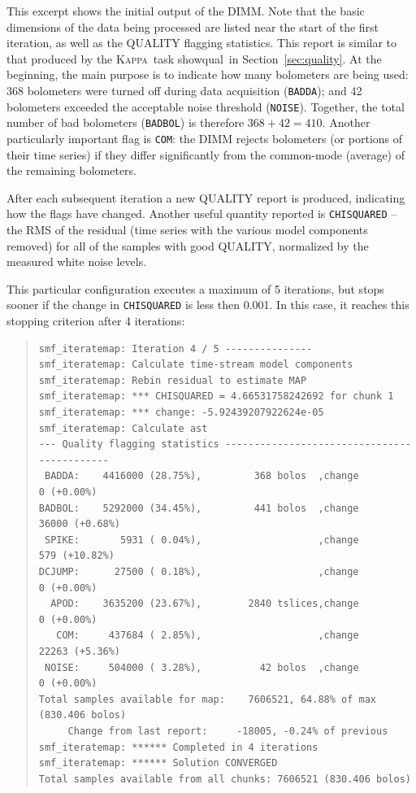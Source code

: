 \documentclass[twoside,11pt]{article}
\newcommand{\xref}[3]{#1}
\renewcommand{\_}{\texttt{\symbol{95}}}
\newenvironment{myquote}{\begin{quote}\begin{small}}{\end{small}\end{quote}}
\newcommand{\Kappa}{\xref{\textsc{Kappa}}{sun95}{}}
\newcommand{\task}[1]{\textsf{#1}}
\newcommand{\showqual}{\xref{\task{showqual}}{sun95}{SHOWQUAL}}
\begin{document}
This excerpt shows the initial output of the DIMM. Note that the basic
dimensions of the data being processed are listed near the start of
the first iteration, as well as the QUALITY flagging statistics. This
report is similar to that produced by the \Kappa\ task \showqual\ in
Section~\ref{sec:quality}. At the beginning, the main purpose is to
indicate how many bolometers are being used: 368 bolometers were turned
off during data acquisition (\texttt{BADDA}); and 42 bolometers
exceeded the acceptable noise threshold (\texttt{NOISE}). Together,
the total number of bad bolometers (\texttt{BADBOL}) is therefore
$368+42=410$. Another particularly important flag is \texttt{COM}: the
DIMM rejects bolometers (or portions of their time series) if they
differ significantly from the common-mode (average) of the remaining
bolometers.

After each subsequent iteration a new QUALITY report is
produced, indicating how the flags have changed. Another useful
quantity reported is \texttt{CHISQUARED} -- the RMS of the residual
(time series with the various model components removed) for all of the
samples with good QUALITY, normalized by the measured white noise
levels.

This particular configuration executes a maximum of 5 iterations, but
stops sooner if the change in \texttt{CHISQUARED} is less then
0.001. In this case, it reaches this stopping criterion after 4
iterations:

\begin{myquote}
\begin{verbatim}
smf_iteratemap: Iteration 4 / 5 ---------------
smf_iteratemap: Calculate time-stream model components
smf_iteratemap: Rebin residual to estimate MAP
smf_iteratemap: *** CHISQUARED = 4.66531758242692 for chunk 1
smf_iteratemap: *** change: -5.92439207922624e-05
smf_iteratemap: Calculate ast
--- Quality flagging statistics --------------------------------------------
 BADDA:    4416000 (28.75%),         368 bolos  ,change          0 (+0.00%)
BADBOL:    5292000 (34.45%),         441 bolos  ,change      36000 (+0.68%)
 SPIKE:       5931 ( 0.04%),                    ,change        579 (+10.82%)
DCJUMP:      27500 ( 0.18%),                    ,change          0 (+0.00%)
  APOD:    3635200 (23.67%),        2840 tslices,change          0 (+0.00%)
   COM:     437684 ( 2.85%),                    ,change      22263 (+5.36%)
 NOISE:     504000 ( 3.28%),          42 bolos  ,change          0 (+0.00%)
Total samples available for map:    7606521, 64.88% of max (830.406 bolos)
     Change from last report:     -18005, -0.24% of previous
smf_iteratemap: ****** Completed in 4 iterations
smf_iteratemap: ****** Solution CONVERGED
Total samples available from all chunks: 7606521 (830.406 bolos)
\end{verbatim}
\end{myquote}
\end{document}
